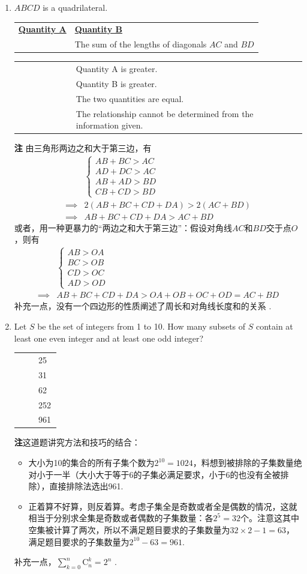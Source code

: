 \documentclass[11pt,space]{ctexart}
\renewcommand{\oval}{
\begin{tikzpicture}
  \draw (0,0) ellipse (.15cm and .075cm);
\end{tikzpicture}
}
\newcommand{\options}[5]{
\begin{center}
\begin{tabularx}{\linewidth}{>{\raggedleft\arraybackslash}p{0.45\linewidth} p{0.5\linewidth}}
    \oval & {#1} \\
    \oval & {#2} \\
    \oval & {#3} \\
    \oval & {#4} \\
    \oval & {#5}
\end{tabularx}
\end{center}
}
\newcommand{\quantities}[2]{
\begin{center}
    \begin{tabularx}{\linewidth}{*{2}{>{\centering\arraybackslash}X}}
    \textbf{\underline{Quantity A}} & \textbf{\underline{Quantity B}}\\
    {#1} & {#2}
    \end{tabularx}
\end{center}
    
\begin{center}
\begin{tabularx}{\linewidth}{>{\raggedleft\arraybackslash}p{0.2\linewidth} p{0.8\linewidth}}
    \oval & Quantity A is greater. \\
    \oval & Quantity B is greater. \\
    \oval & The two quantities are equal. \\
    \oval & The relationship cannot be determined from the information given.
\end{tabularx}
\end{center}
}
\renewcommand{\note}[1]{{\heiti\textbf{注\hspace{1em}}}#1.}
\begin{document}
\begin{enumerate}
\item $ABCD$ is a quadrilateral. 
\quantities{The perimeter of $ABCD$}{The sum of the lengths of diagonals $AC$ and $BD$}
\note{
由三角形两边之和大于第三边，有
\begin{equation*}
    \begin{aligned}
        & \begin{cases}
            A B + B C > A C \\
            A D + D C > A C \\
            A B + A D > B D \\
            C B + C D > B D 
        \end{cases}\\
        \implies & 2(A B + B C + C D + D A) > 2(A C + B D)\\
        \implies & A B + B C + C D + D A > A C + B D
    \end{aligned}
\end{equation*}
或者，用一种更暴力的“两边之和大于第三边”：假设对角线$AC$和$BD$交于点$O$，则有
\begin{equation*}
    \begin{aligned}
        & \begin{cases}
            AB>OA\\
            BC>OB\\
            CD>OC\\
            AD>OD
        \end{cases}\\
        \implies & A B + B C + C D + D A > OA+OB+OC+OD=AC+BD
    \end{aligned}
\end{equation*}
补充一点，没有一个四边形的性质阐述了周长和对角线长度和的关系
}

\item Let $S$ be the set of integers from 1 to 10. How many subsets of $S$ contain at least one even integer and at least one odd integer?
\options{25}{31}{62}{252}{961}
\note{这道题讲究方法和技巧的结合：
\begin{itemize}
    \item 大小为10的集合的所有子集个数为$2^{10} = 1024$，料想到被排除的子集数量绝对小于一半（大小大于等于6的子集必满足要求，小于6的也没有全被排除），直接排除法选出961.
    \item 正着算不好算，则反着算。考虑子集全是奇数或者全是偶数的情况，这就相当于分别求全集是奇数或者偶数的子集数量：各$2^5 = 32$个。注意这其中空集被计算了两次，所以不满足题目要求的子集数量为$32\times 2-1 = 63$，满足题目要求的子集数量为$2^{10}-63=961$.
\end{itemize}
补充一点，$\sum_{k = 0}^n\mathrm{C}_{n}^k = 2^n$
}


\end{enumerate}
\end{document}
